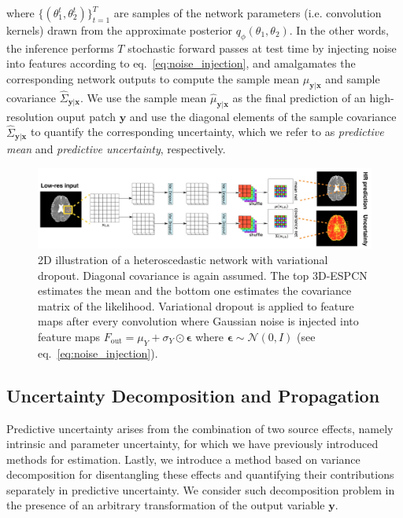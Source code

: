 where $\{(\theta^t_1,\theta^t_2)\}_{t=1}^T$ are samples of the network parameters (i.e. convolution kernels) drawn from the approximate posterior $ q_{\phi}(\theta_1, \theta_{2})$. In the other words, the inference performs $T$ stochastic forward passes at test time by injecting noise into features according to eq.~\ref{eq:noise_injection}, and amalgamates the corresponding network outputs to compute the sample mean $\hat{\mu}_{\mathbf{y}|\mathbf{x}}$ and sample covariance $\hat{\Sigma}_{\mathbf{y}|\mathbf{x}}$. We use the sample mean $\hat{\mu}_{\mathbf{y}|\mathbf{x}}$  as the final prediction of an high-resolution ouput patch $\mathbf{y}$ and use the diagonal elements of the sample covariance $\hat{\Sigma}_{\mathbf{y}|\mathbf{x}}$ to quantify the corresponding uncertainty, which we refer to as \textit{predictive mean} and \textit{predictive uncertainty}, respectively. 



\begin{figure}
	\includegraphics[width=\linewidth]{chapter_3/figures/fig_2_2.png}
	\centering	
	\small 
	\vspace{-8mm}
	\caption{\small 2D illustration of a heteroscedastic network with variational dropout. Diagonal covariance is again assumed. The top 3D-ESPCN estimates the mean and the bottom one estimates the covariance matrix of the likelihood. Variational dropout is applied to feature maps after every convolution where Gaussian noise is injected into feature maps $F_{\text{out}} = \mu_{Y} +  \sigma_{Y} \odot \mathbf{\epsilon}$ where $\mathbf{\epsilon} \sim \mathcal{N}(0,I)$ (see eq.~\ref{eq:noise_injection}). } 
	\label{fig:heterovar}
\end{figure}

\subsection{Uncertainty Decomposition and Propagation} \label{sec:uncertainty_decom}
Predictive uncertainty arises from the combination of two source effects, namely intrinsic and parameter uncertainty, for which we have previously introduced methods for estimation. Lastly, we introduce a method based on variance decomposition for disentangling these effects and quantifying their contributions separately in predictive uncertainty. We consider such decomposition problem in the presence of an arbitrary transformation of the output variable $\mathbf{y}$. 

